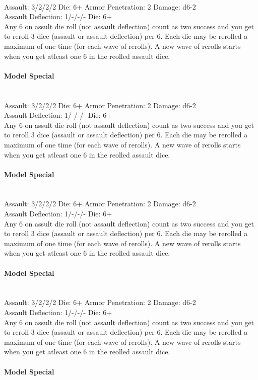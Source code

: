 \ \\
Assault: 3/2/2/2 Die: 6+ Armor Penetration: 2 Damage: d6-2 \\
Assault Deflection: 1/-/-/- Die: 6+\\
\indent Any 6 on assult die roll (not assault deflection) count as two success and you get to reroll 3 dice (assault or assault deflection) per 6. Each die may be rerolled a maximum of one time (for each wave of rerolls). A new wave of rerolls starts when you get atleast one 6 in the reolled assault dice. \\
\ \\
{\bf Model Special} \\

\ \\

\ \\
Assault: 3/2/2/2 Die: 6+ Armor Penetration: 2 Damage: d6-2 \\
Assault Deflection: 1/-/-/- Die: 6+\\
\indent Any 6 on assult die roll (not assault deflection) count as two success and you get to reroll 3 dice (assault or assault deflection) per 6. Each die may be rerolled a maximum of one time (for each wave of rerolls). A new wave of rerolls starts when you get atleast one 6 in the reolled assault dice. \\
\ \\
{\bf Model Special} \\

\ \\

\ \\
Assault: 3/2/2/2 Die: 6+ Armor Penetration: 2 Damage: d6-2 \\
Assault Deflection: 1/-/-/- Die: 6+\\
\indent Any 6 on assult die roll (not assault deflection) count as two success and you get to reroll 3 dice (assault or assault deflection) per 6. Each die may be rerolled a maximum of one time (for each wave of rerolls). A new wave of rerolls starts when you get atleast one 6 in the reolled assault dice. \\
\ \\
{\bf Model Special} \\

\ \\

\ \\
Assault: 3/2/2/2 Die: 6+ Armor Penetration: 2 Damage: d6-2 \\
Assault Deflection: 1/-/-/- Die: 6+\\
\indent Any 6 on assult die roll (not assault deflection) count as two success and you get to reroll 3 dice (assault or assault deflection) per 6. Each die may be rerolled a maximum of one time (for each wave of rerolls). A new wave of rerolls starts when you get atleast one 6 in the reolled assault dice. \\
\ \\
{\bf Model Special} \\

